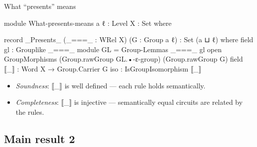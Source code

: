 \documentclass[aspectratio=169]{beamer}
\begin{document}
\begin{frame}{What ``presents'' means}
  \begin{code}[hide]
module What-presents-means {a ℓ : Level} {X : Set} where
\end{code}
\begin{code}
  record _Presents_ (_===_ : WRel X) (G : Group a ℓ) : Set (a ⊔ ℓ) where
    field gl : Grouplike _===_
    module GL = Group-Lemmas _===_ gl
    open GroupMorphisms (Group.rawGroup GL.•-ε-group) (Group.rawGroup G)
    field
      ⟦_⟧  : Word X → Group.Carrier G
      iso  : IsGroupIsomorphism ⟦_⟧
\end{code}
  \vfill
  \begin{center}
  \end{center}
  \begin{itemize}
    \item \emph{Soundness}: {\AgdaCodeFont ⟦\_⟧} is well defined ---
          each rule holds semantically.
    \item \emph{Completeness}: {\AgdaCodeFont ⟦\_⟧} is injective ---
          semantically equal circuits are related by the rules.
  \end{itemize}
\end{frame}

\subsection{Main result 2}
\end{document}
